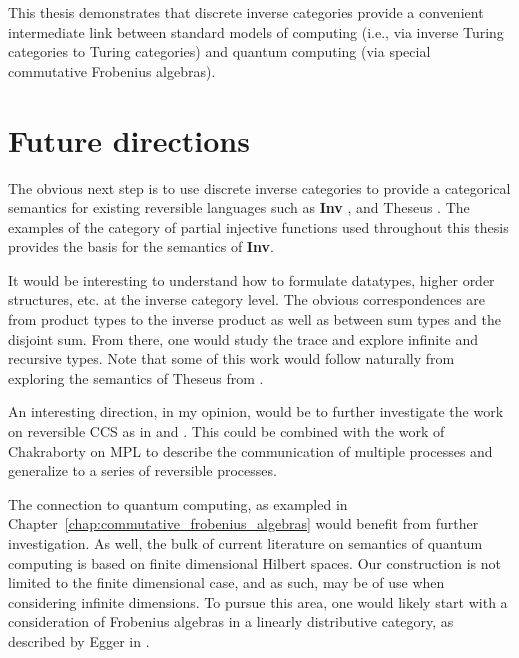This thesis demonstrates that discrete inverse categories provide a convenient intermediate link
between standard models of computing (i.e., via inverse Turing categories to Turing categories) and
quantum computing (via special commutative Frobenius algebras).

\section{Future directions}
\label{sec:whither-next}

The obvious next step is to use discrete inverse categories to provide a categorical semantics for
existing reversible languages such as \textbf{Inv} \cite{muetal04:injreversible}, and Theseus
\cite{james2013isomorphic,james2012information}. The examples of the category of partial injective
functions used throughout this thesis provides the basis for the semantics of \textbf{Inv}.

It would be interesting to understand how to formulate datatypes, higher order structures, etc. at the
inverse category level. The obvious correspondences are from product types to the inverse product as
well as between sum types and the disjoint sum. From there, one would study the trace and explore
infinite and recursive types. Note that some of this work would follow naturally from exploring the semantics
of Theseus from \cite{james2013isomorphic,james2012information}.

An interesting direction, in my opinion, would be to further investigate the work on reversible
CCS as in \cite{danos2004reversible} and \cite{phillips2006operational}. This could be combined with
the work of Chakraborty on MPL \cite{chakraborty2014} to describe the communication of multiple
processes and generalize to a series of reversible processes.


The connection to quantum computing, as exampled in
Chapter~\ref{chap:commutative_frobenius_algebras} would benefit from further investigation. As well,
the bulk of current literature on semantics of quantum computing is based on finite dimensional
Hilbert spaces. Our construction is not limited to the finite dimensional
case, and as such, may be of use when considering infinite dimensions. To pursue this area, one
would likely start with a consideration of Frobenius algebras in a linearly distributive category,
as described by Egger in \cite{egger2010frobenius}.


